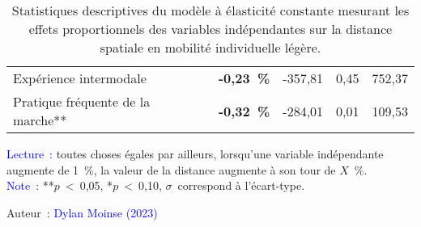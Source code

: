 \begin{table}[h!]
{\begin{tabular}{p{}p{}p{}p{}p{}}
\small{Expérience intermodale} & \small{\textbf{-0,23~\%}} & \small{-357,81} & \small{0,45} & \small{752,37}\\
\small{Pratique fréquente de la marche**} & \small{\textbf{-0,32~\%}} & \small{-284,01} & \small{0,01} & \small{109,53}\\
        \hline
        \end{tabular}}
    \caption{Statistiques descriptives du modèle à élasticité constante mesurant les effets proportionnels des variables indépendantes sur la distance spatiale en mobilité individuelle légère.}
    \label{table-chap5:facteurs-distance-spatiale}
        \vspace{5pt}
        \begin{flushleft}\scriptsize{
        \textcolor{blue}{Lecture~:} toutes choses égales par ailleurs, lorsqu'une variable indépendante augmente de 1~\%, la valeur de la distance augmente à son tour de $X$~\%.
        \\
        \textcolor{blue}{Note~:} **$p$~\textless~0,05, *$p$~\textless~0,10, $\sigma$~correspond à l'écart-type.
        }\end{flushleft}
        \begin{flushright}\scriptsize
        Auteur~: \textcolor{blue}{Dylan Moinse (2023)}
        \end{flushright}
        \end{table}